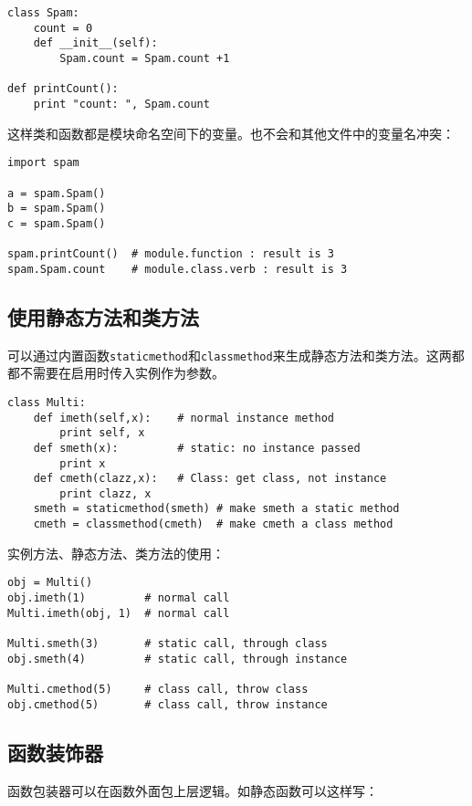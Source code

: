 \begin{lstlisting}
class Spam:
	count = 0
	def __init__(self):
		Spam.count = Spam.count +1

def printCount():
	print "count: ", Spam.count
\end{lstlisting}

这样类和函数都是模块命名空间下的变量。也不会和其他文件中的变量名冲突：

\begin{lstlisting}
import spam

a = spam.Spam()
b = spam.Spam()
c = spam.Spam()

spam.printCount()  # module.function : result is 3
spam.Spam.count    # module.class.verb : result is 3
\end{lstlisting}

\subsection{使用静态方法和类方法}

可以通过内置函数\verb|staticmethod|和\verb|classmethod|来生成静态方法和类方法。这两都都不需要在启用时传入实例作为参数。

\begin{lstlisting}
class Multi:
	def imeth(self,x):    # normal instance method
		print self, x
	def smeth(x):         # static: no instance passed
		print x
	def cmeth(clazz,x):   # Class: get class, not instance
		print clazz, x
	smeth = staticmethod(smeth) # make smeth a static method
	cmeth = classmethod(cmeth)  # make cmeth a class method
\end{lstlisting}

实例方法、静态方法、类方法的使用：

\begin{lstlisting}
obj = Multi()
obj.imeth(1)         # normal call
Multi.imeth(obj, 1)  # normal call

Multi.smeth(3)       # static call, through class
obj.smeth(4)         # static call, through instance

Multi.cmethod(5)     # class call, throw class
obj.cmethod(5)       # class call, throw instance
\end{lstlisting}

\subsection{函数装饰器}

函数包装器可以在函数外面包上层逻辑。如静态函数可以这样写：

